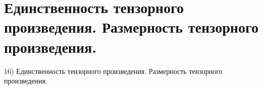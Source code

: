 \section{
 Единственность тензорного произведения. Размерность тензорного произведения.
}

16) Единственность тензорного произведения. Размерность тензорного произведения.
